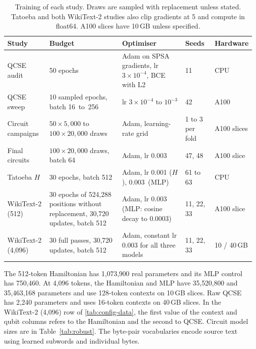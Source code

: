 \documentclass[11pt,a4paper]{article}
\begin{document}
  \begin{table}[H]
    \centering\footnotesize
    \caption{Training of each study. Draws are sampled with replacement unless stated. Tatoeba and both WikiText-2 studies also clip gradients at 5 and compute in float64. A100 slices have 10\,GB unless specified.}
    \label{tab:config-train}
    \setlength{\tabcolsep}{4pt}
    \begin{tabularx}{\linewidth}{@{}lLLll@{}}
      \toprule
      Study              & Budget                                                                          & Optimiser                                                & Seeds           & Hardware    \\
      \midrule
      QCSE audit         & 50 epochs                                                                       & Adam on SPSA gradients, lr~$3\times10^{-4}$, BCE with L2 & 11              & CPU         \\
      QCSE sweep         & 10 sampled epochs, batch 16~to~256                                              & lr $3\times10^{-4}$ to $10^{-3}$                         & 42              & A100        \\
      Circuit campaigns  & $50\times5{,}000$ to $100\times20{,}000$ draws                                  & Adam, learning-rate grid                                 & 1 to 3 per fold & A100 slices \\
      Final circuits     & $100\times20{,}000$ draws, batch 64                                             & Adam, lr 0.003                                           & 47, 48          & A100 slice  \\
      Tatoeba $H$        & 30 epochs, batch 512                                                            & Adam, lr 0.001 ($H$), 0.003~(MLP)                        & 61 to 63        & CPU         \\
      WikiText-2 (512)   & 30 epochs of 524,288 positions without replacement, 30,720 updates, batch 512 & Adam, lr 0.003 (MLP: cosine decay to 0.0003)               & 11, 22, 33      & A100 slice  \\
      WikiText-2 (4,096) & 30 full passes, 30,720 updates, batch 512                                       & Adam, constant lr 0.003 for all three models             & 11, 22, 33      & 10 / 40\,GB \\
      \bottomrule
    \end{tabularx}
  \end{table}

  The 512-token Hamiltonian has 1,073,900 real parameters and its MLP control has 750,460. At 4,096 tokens, the Hamiltonian and MLP have 35,520,800 and 35,463,168 parameters and use 128-token contexts on 10\,GB slices. Raw QCSE has 2,240 parameters and uses 16-token contexts on 40\,GB slices. In the WikiText-2 (4,096) row of \cref{tab:config-data}, the first value of the context and qubit columns refers to the Hamiltonian and the second to QCSE. Circuit model sizes are in Table~\ref{tab:robust}. The byte-pair vocabularies encode source text using learned subwords and individual bytes.
\fi
\end{document}
